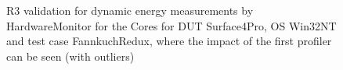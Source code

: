 \begin{figure}
                            \caption{R3 validation for dynamic energy measurements by HardwareMonitor for the Cores for DUT Surface4Pro, OS Win32NT and test case FannkuchRedux, where the impact of the first profiler can be seen (with outliers)} \label{fig:Surface4Pro_HardwareMonitor_Cores_R3_dynamic_energy_with_outliers_Win32NT_avg_watts}
                            \end{figure}
                            